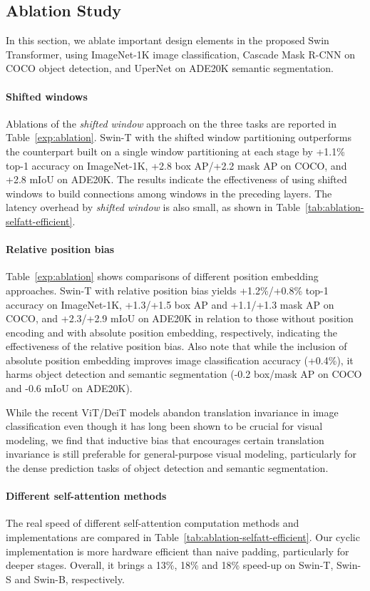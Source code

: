 \documentclass[10pt,twocolumn,letterpaper]{article}
\begin{document}
\subsection{Ablation Study}

In this section, we ablate important design elements in the proposed Swin Transformer, using ImageNet-1K image classification, Cascade Mask R-CNN on COCO object detection, and UperNet on ADE20K semantic segmentation.

\paragraph{Shifted windows}
Ablations of the \emph{shifted window} approach on the three tasks are reported in Table~\ref{exp:ablation}. Swin-T with the shifted window partitioning outperforms the counterpart built on a single window partitioning at each stage by +1.1\% top-1 accuracy on ImageNet-1K, +2.8 box AP/+2.2 mask AP on COCO, and +2.8 mIoU on ADE20K. The results indicate the effectiveness of using shifted windows to build connections among windows in the preceding layers. The latency overhead by \emph{shifted window} is also small, as shown in Table~\ref{tab:ablation-selfatt-efficient}.

\paragraph{Relative position bias} Table~\ref{exp:ablation} shows comparisons of different position embedding approaches. Swin-T with relative position bias yields +1.2\%/+0.8\% top-1 accuracy on ImageNet-1K, +1.3/+1.5 box AP and +1.1/+1.3 mask AP on COCO, and +2.3/+2.9 mIoU on ADE20K in relation to those without position encoding and with absolute position embedding, respectively, indicating the effectiveness of the relative position bias. Also note that while the inclusion of absolute position embedding improves image classification accuracy (+0.4\%), it harms object detection and semantic segmentation (-0.2 box/mask AP on COCO and -0.6 mIoU on ADE20K). 

While the recent ViT/DeiT models abandon translation invariance in image classification even though it has long been shown to be crucial for visual modeling, we find that inductive bias that encourages certain translation invariance is still preferable for general-purpose visual modeling, particularly for the dense prediction tasks of object detection and semantic segmentation.

\paragraph{Different self-attention methods} The real speed of different self-attention computation methods and implementations are compared in Table~\ref{tab:ablation-selfatt-efficient}. Our cyclic implementation is more hardware efficient than naive padding, particularly for deeper stages. Overall, it brings a 13\%, 18\% and 18\% speed-up on Swin-T, Swin-S and Swin-B, respectively.
\end{document}

